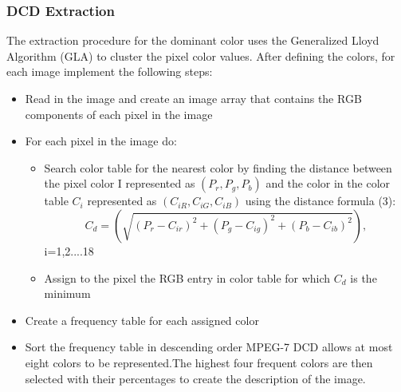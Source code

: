 \subsubsection{DCD Extraction}
The  extraction  procedure  for  the dominant  color  uses  the Generalized
Lloyd Algorithm (GLA)\cite{vector}  to  cluster  the  pixel  color  values.
After  defining  the  colors,  for  each  image implement the following steps:
\begin{itemize}
\item Read  in  the  image  and  create  an  image  array  that 
contains  the RGB components of each pixel  in  the 
image
\item For each pixel in the image do: 
	\begin{itemize}
	\item Search  color  table  for  the  nearest  color  by finding  the distance between  the pixel  color  I 
		represented as  $(P_{r}, P_{g}, P_{b})$ and  the color  in  the color  table $ C_{i}$  represented  as 
		$(C_{iR},  C_{iG},  C_{iB})$ using the distance formula (3): 
		\[  C_{d}=(\sqrt{(P_{r}-C_{ir})^2 + (P_{g}-C_{ig})^2 + (P_{b}-C_{ib})^2}), \]
                        \qquad  i=1,2....18
	\item Assign  to  the  pixel  the  RGB  entry  in  color table for which $C_{d}$ is the minimum
	\end{itemize}
\item Create a frequency table for each assigned color 
\item Sort  the  frequency  table  in  descending  order MPEG-7  DCD  allows  at  most  eight  colors  to  be 
	represented.The  highest  four  frequent colors  are  then  selected  with  their  percentages  to 
	create the description of the image.
\end{itemize}


